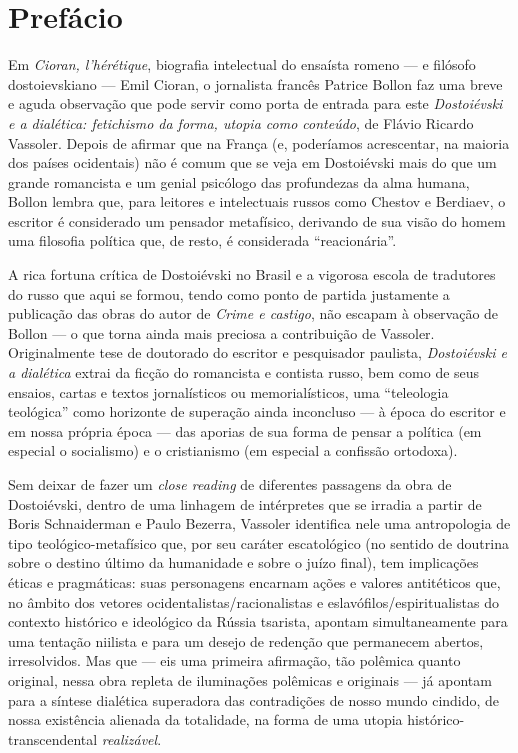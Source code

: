 \chapter*{Prefácio}



Em \emph{Cioran, l'hérétique}, biografia intelectual do ensaísta romeno
--- e filósofo dostoievskiano --- Emil Cioran, o jornalista francês
Patrice Bollon faz uma breve e aguda observação que pode servir como
porta de entrada para este \emph{Dostoiévski e a dialética: fetichismo
da forma, utopia como conteúdo}, de Flávio Ricardo Vassoler. Depois de
afirmar que na França (e, poderíamos acrescentar, na maioria dos países
ocidentais) não é comum que se veja em Dostoiévski mais do que um grande
romancista e um genial psicólogo das profundezas da alma humana, Bollon
lembra que, para leitores e intelectuais russos como Chestov e Berdiaev,
o escritor é considerado um pensador metafísico, derivando de sua visão
do homem uma filosofia política que, de resto, é considerada
``reacionária''.

A rica fortuna crítica de Dostoiévski no Brasil e a vigorosa escola de
tradutores do russo que aqui se formou, tendo como ponto de partida
justamente a publicação das obras do autor de \emph{Crime e castigo},
não escapam à observação de Bollon --- o que torna ainda mais preciosa a
contribuição de Vassoler. Originalmente tese de doutorado do escritor e
pesquisador paulista, \emph{Dostoiévski e a dialética} extrai da
ficção do romancista e contista russo, bem como de seus ensaios, cartas
e textos jornalísticos ou memorialísticos, uma ``teleologia teológica''
como horizonte de superação ainda inconcluso --- à época do escritor e em
nossa própria época --- das aporias de sua forma de pensar a política (em
especial o socialismo) e o cristianismo (em especial a confissão
ortodoxa).

Sem deixar de fazer um \emph{close reading} de diferentes passagens da
obra de Dostoiévski, dentro de uma linhagem de intérpretes que se irradia
a partir de Boris Schnaiderman e Paulo Bezerra, Vassoler identifica nele uma
antropologia de tipo teológico-metafísico que, por seu caráter
escatológico (no sentido de doutrina sobre o destino último da
humanidade e sobre o juízo final), tem implicações éticas e pragmáticas:
suas personagens encarnam ações e valores antitéticos que, no âmbito dos
vetores ocidentalistas/racionalistas e eslavófilos/espiritualistas do
contexto histórico e ideológico da Rússia tsarista, apontam
simultaneamente para uma tentação niilista e para um desejo de redenção
que permanecem abertos, irresolvidos. Mas que --- eis uma primeira
afirmação, tão polêmica quanto original, nessa obra repleta de
iluminações polêmicas e originais --- já apontam para a síntese dialética
superadora das contradições de nosso mundo cindido, de nossa existência
alienada da totalidade, na forma de uma utopia histórico-transcendental
\emph{realizável}.

